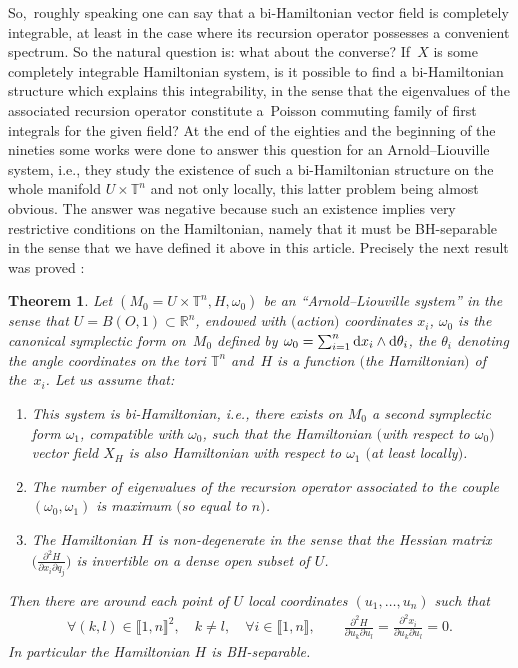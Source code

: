 \documentclass[pdftex]{sigma}%
\numberwithin{equation}{section}
\newtheorem{Theorem}{Theorem}[section]
\begin{document}
So,~roughly speaking one can say that a bi-Hamiltonian vector field is completely integrable, at least in the case where its recursion operator possesses a convenient spectrum. So the natural question is: what about the converse? If~$X$ is some completely integrable Hamiltonian system, is it possible to find a bi-Hamiltonian structure which explains this integrability, in the sense that the eigenvalues of the associated recursion operator constitute a~Poisson commuting family of first integrals for the given field? At the end of the eighties and the beginning of the nineties some works \cite{Br, BrMoTu, Fe} were done to answer this question for an Arnold--Liouville system, i.e., they study the existence of such a bi-Hamiltonian structure on the whole manifold $U\times\mathbb{T}^n$ and not only locally, this latter problem being almost obvious. The answer was negative because such an existence implies very restrictive conditions on the Hamiltonian, namely that it must be BH-separable in the sense that we have defined it above in this article.
Precisely the next result was proved \cite{Br, BrMoTu, Fe}:

\begin{Theorem}\label{BHthm}
	Let $(M_0=U\times\mathbb{T}^n,H,\omega_0)$ be an ``Arnold--Liouville system'' in the sense that $U=B(O,1)\subset\mathbb{R}^n$, endowed with $($action$)$ coordinates $x_i$, $\omega_0$ is the canonical symplectic form on~$M_0$ defined by $\omega_0=\sum_{i=1}^n{\rm d}x_i\wedge {\rm d}\theta_i$, the $\theta_i$ denoting the angle coordinates on the tori $\mathbb{T}^n$ and~$H$ is a function $($the Hamiltonian$)$ of the~$x_i$. Let us assume that:
\begin{enumerate}\itemsep=0pt	
	\item[$(i)$] This system is bi-Hamiltonian, i.e., there exists on $M_0$ a second symplectic form $\omega_1$, compatible with $\omega_0$, such that the Hamiltonian $($with respect to $\omega_0)$ vector field $X_H$ is also Hamiltonian with respect to $\omega_1$ $($at least locally$)$.
	
	\item[$(ii)$] The number of eigenvalues of the recursion operator associated to the couple $(\omega_0,\omega_1)$ is maximum $($so equal to $n)$.
	
	\item[$(iii)$] The Hamiltonian $H$ is non-degenerate in the sense that the Hessian matrix $\big(\frac{\partial^2H}{\partial x_i\partial q_j}\big)$ is invertible on a dense open subset of $U$.
\end{enumerate}
	
	Then there are around each point of $U$ local coordinates $(u_1,\dots,u_n)$ such that
\begin{gather*}
\forall (k,l)\in\llbracket 1,n\rrbracket^2,\quad
k\not=l,\quad \forall i\in\llbracket 1,n\rrbracket,\qquad
\frac{\partial^2 H}{\partial u_k\partial u_l}=\frac{\partial^2 x_i}{\partial u_k\partial u_l}=0.
\end{gather*}
	In particular the Hamiltonian $H$ is BH-separable.
\end{Theorem}
\end{document}

